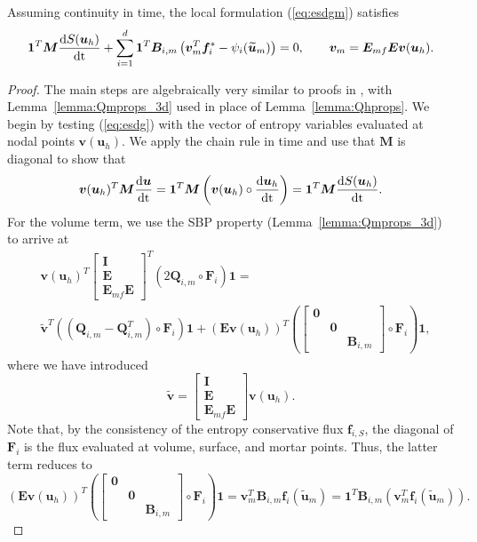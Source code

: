 \documentclass{svjour3}                     %
\renewcommand{\tilde}{\widetilde}
\newcommand{\td}[2]{\frac{{\rm d}#1}{{\rm d}{\rm #2}}}
\newcommand{\LRp}[1]{\left( #1 \right)}
\begin{document}
\begin{theorem}
Assuming continuity in time, the local formulation (\ref{eq:esdgm}) satisfies 
\begin{equation}
\bm{1}^T\bm{M}\td{S(\bm{u}_h)}{t} + \sum_{i=1}^d\bm{1}^T\bm{B}_{i,m}\LRp{\bm{v}_m^T\bm{f}_i^* - \psi_i(\tilde{\bm{u}}_m)} = 0, \qquad \bm{v}_m =\bm{E}_{mf}\bm{E}\bm{v}(\bm{u}_h).
\label{eq:localec}
\end{equation}
\end{theorem}
\begin{proof}
The main steps are algebraically very similar to proofs in \cite{chan2018discretely, chan2018efficient, chan2019skew}, with Lemma~\ref{lemma:Qmprops_3d} used in place of Lemma~\ref{lemma:Qhprops}.  We begin by testing (\ref{eq:esdg}) with the vector of entropy variables evaluated at nodal points $\bm{v}(\bm{u}_h)$.  We apply the chain rule in time and use that $\bm{M}$ is diagonal to show that 
\[
\bm{v}(\bm{u}_h)^T\bm{M}\td{\bm{u}}{t} = \bm{1}^T\bm{M}\LRp{\bm{v}(\bm{u}_h)\circ \td{\bm{u}_h}{t}} =  \bm{1}^T\bm{M}\td{S(\bm{u}_h)}{t}.
\]
For the volume term, we use the SBP property (Lemma~\ref{lemma:Qmprops_3d}) to arrive at
\begin{align*}
&\bm{v}(\bm{u}_h)^T\begin{bmatrix} \bm{I} \\ \bm{E} \\ \bm{E}_{mf}\bm{E} \end{bmatrix}^T\LRp{2\bm{Q}_{i,m} \circ \bm{F}_i}\bm{1} = \\
&\tilde{\bm{v}}^T\LRp{\LRp{\bm{Q}_{i,m}-\bm{Q}_{i,m}^T} \circ \bm{F}_i}\bm{1}  + \LRp{\bm{E}\bm{v}(\bm{u}_h)}^T\LRp{\begin{bmatrix}\bm{0} && \\ & \bm{0} & \\ & & \bm{B}_{i,m}\end{bmatrix} \circ\bm{F}_i}\bm{1},
\end{align*}
where we have introduced 
\[
\tilde{\bm{v}} = {\begin{bmatrix} \bm{I} \\ \bm{E} \\ \bm{E}_{mf}\bm{E} \end{bmatrix}\bm{v}(\bm{u}_h)}.  
\]
Note that, by the consistency of the entropy conservative flux $\bm{f}_{i,S}$, the diagonal of $\bm{F}_i$ is the flux evaluated at volume, surface, and mortar points. Thus, the latter term reduces to 
\[
\LRp{\bm{E}\bm{v}(\bm{u}_h)}^T\LRp{\begin{bmatrix}\bm{0} && \\ & \bm{0} & \\ & & \bm{B}_{i,m}\end{bmatrix} \circ\bm{F}_i}\bm{1} = \bm{v}_m^T \bm{B}_{i,m}\bm{f}_i(\tilde{\bm{u}}_m) =  \bm{1}^T \bm{B}_{i,m}\LRp{\bm{v}_m^T\bm{f}_i(\tilde{\bm{u}}_m)}.
\]
\end{proof}
\end{document}
